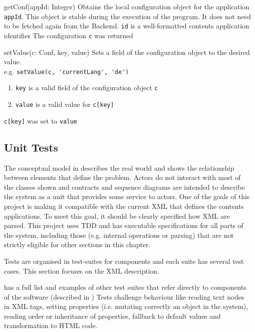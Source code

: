\begin{sopcontract}{getConf(appId: Integer)}
{Obtains the local configuration object for the application \texttt{appId}. This object is stable during the execution of the program. It does not need to be fetched again from the Backend.}
{\texttt{id} is a well-formatted contents application identifier}
{The configuration \texttt{c} was returned}
\end{sopcontract}

\begin{sopcontract}{setValue(c: Conf, key, value)}
{Sets a field of the configuration object to the desired value.\\ e.g. \lstinline$setValue(c, 'currentLang', 'de')$}
{
\begin{enumerate}
    \item \texttt{key} is a valid field of the configuration object \texttt{c}
    \item \texttt{value} is a valid value for \lstinline$c[key]$
\end{enumerate}
}
{\lstinline$c[key]$ was set to \texttt{value}}
\end{sopcontract}

\subsection{Unit Tests}
The conceptual model in  describes the real world and shows the relationship between elements that define the problem.
Actors do not interact with most of the classes shown and contracts and sequence diagrams are intended to describe the system as a unit that provides some service to actors.
One of the goals of this project is making it compatible with the current \ac{XML} that defines the contents applications.
To meet this goal, it should be clearly specified how \ac{XML} are parsed.
This project uses \ac{TDD} and has executable specifications for all parts of the system, including those (e.g. internal operations or parsing) that are not strictly eligible for other sections in this chapter.

Tests are organised in test-suites for components and each suite has several test cases.
This section focuses on the \ac{XML} description.

 has a full list and examples of other test suites that refer directly to components of the software (described in )
Tests challenge behaviour like reading text nodes in \ac{XML} tags, setting properties (i.e. mutating correctly an object in the system), reading order or inheritance of properties, fallback to default values and transformation to \ac{HTML} code.


